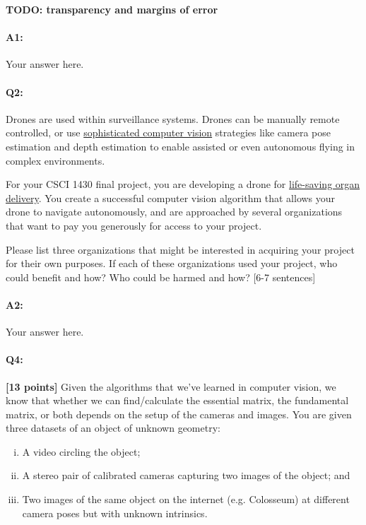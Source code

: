 \textbf{TODO: transparency and margins of error}

\paragraph{A1:} Your answer here.


\pagebreak
\paragraph{Q2:} Drones are used within surveillance systems. Drones can be manually remote controlled, or use \href{https://link.springer.com/article/10.1007/s10846-017-0483-z}{sophisticated computer vision} strategies like camera pose estimation and depth estimation to enable assisted or even autonomous flying in complex environments.

For your CSCI 1430 final project, you are developing a drone for \href{https://www.cnn.com/2019/05/01/health/drone-organ-transplant-bn-trnd/index.html}{life-saving organ delivery}. You create a successful computer vision algorithm that allows your drone to navigate autonomously, and are approached by several organizations that want to pay you generously for access to your project.

Please list three organizations that might be interested in acquiring your project for their own purposes. If each of these organizations used your project, who could benefit and how? Who could be harmed and how? [6-7 sentences]

\paragraph{A2:} Your answer here.




\pagebreak
\paragraph{Q4:} \textbf{[13 points]}
Given the algorithms that we've learned in computer vision, we know that whether we can find/calculate the essential matrix, the fundamental matrix, or both depends on the setup of the cameras and images. You are given three datasets of an object of unknown geometry:

\begin{enumerate}[(i)]
\item A video circling the object;
\item A stereo pair of calibrated cameras capturing two images of the object; and
\item Two images of the same object on the internet (e.g. Colosseum) at different camera poses but with unknown intrinsics.
\end{enumerate}


